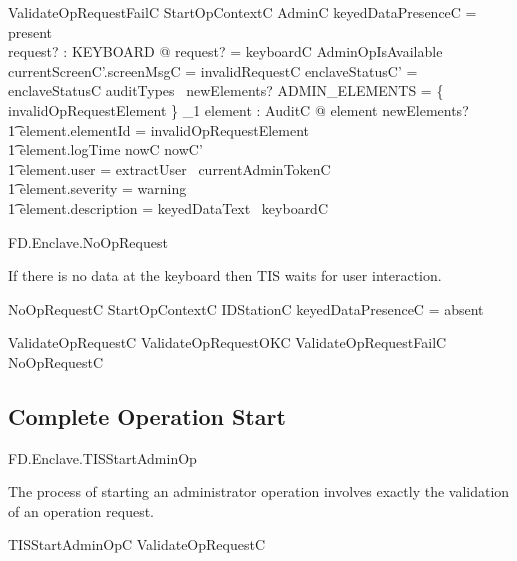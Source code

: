 \begin{schema}{ValidateOpRequestFailC}
        StartOpContextC
\also
        \Xi AdminC
\where
        keyedDataPresenceC = present
\\      \exists request? : KEYBOARD @ request? = keyboardC \land
\lnot AdminOpIsAvailable 
\also
        currentScreenC'.screenMsgC = invalidRequestC
\also
        enclaveStatusC' = enclaveStatusC
\also
        auditTypes~ newElements? \cap ADMIN\_ELEMENTS = 
        \{ invalidOpRequestElement \} 
\also
        \exists_1 element : AuditC @ element \in newElements? 
\\ \t1  \land element.elementId = invalidOpRequestElement
\\ \t1  \land element.logTime \in nowC \upto nowC'
\\ \t1  \land element.user = extractUser~ currentAdminTokenC
\\ \t1  \land element.severity = warning
\\ \t1  \land element.description = keyedDataText~ keyboardC
\end{schema}

\begin{traceunit}{FD.Enclave.NoOpRequest}
\end{traceunit}


If there is no data at the keyboard then TIS waits for user interaction.

\begin{schema}{NoOpRequestC}
        StartOpContextC
\also
        \Xi IDStationC
\where
        keyedDataPresenceC = absent
\end{schema}

\begin{zed}
        ValidateOpRequestC  ValidateOpRequestOKC \lor
        ValidateOpRequestFailC \lor NoOpRequestC
\end{zed}

\subsection{Complete Operation Start}
\begin{traceunit}{FD.Enclave.TISStartAdminOp}
\end{traceunit}


The process of starting an administrator operation involves exactly the validation of an
operation request.

\begin{zed}
        TISStartAdminOpC  ValidateOpRequestC
\end{zed}


